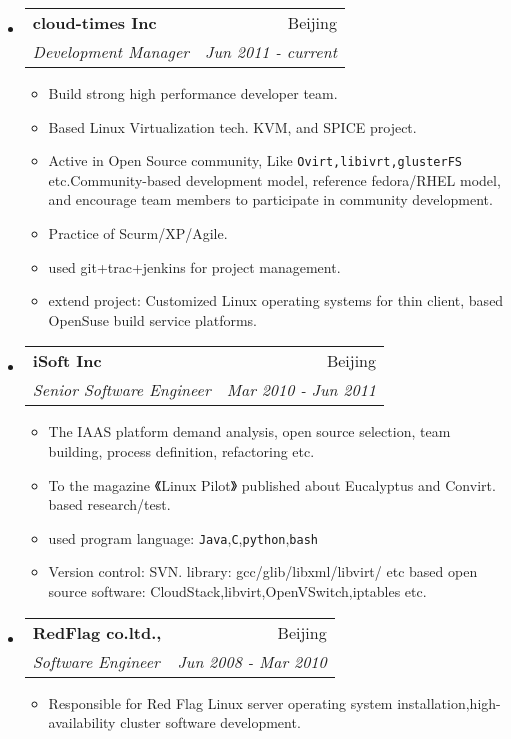 \documentclass[letterpaper,11pt]{article}
\makeatletter
\newcommand{\resitem}[1]{\item #1 \vspace{-2pt}}
\newcommand{\ressubheading}[4]{

\begin{tabular*}{6.5in}{l@{\cftdotfill{\cftsecdotsep}\extracolsep{\fill}}r}

		\textbf{#1} & #2 \\

		\textit{#3} & \textit{#4} \\

\end{tabular*}\vspace{-6pt}}
\makeatother
\begin{document}
\begin{itemize}

\item

	\ressubheading{cloud-times Inc}{Beijing}{Development Manager}{Jun 2011 - current}

	\begin{itemize}

		\resitem{Build strong high performance developer team.}
                \resitem{Based Linux Virtualization tech. KVM, and SPICE project.}
        \resitem{Active in Open Source community, Like \texttt{Ovirt,libivrt,glusterFS} etc.Community-based development model, reference fedora/RHEL model, and encourage team members to participate in community development.}
                \resitem{Practice of Scurm/XP/Agile.}
                \resitem{used git+trac+jenkins for project management.}
                \resitem{extend project: Customized Linux operating systems for thin client, based OpenSuse build service platforms.}

	\end{itemize}

\item

	\ressubheading{iSoft Inc}{Beijing}{Senior Software Engineer}{Mar 2010 - Jun 2011}

	\begin{itemize}

		\resitem{The IAAS platform demand analysis, open source selection, team building, process definition, refactoring etc.}

                \resitem{To the magazine 《Linux Pilot》 published about Eucalyptus and Convirt. based research/test.}

                \resitem{used program language: \texttt{Java},\texttt{C},\texttt{python},\texttt{bash}}
               
               \resitem{Version control: SVN. library: gcc/glib/libxml/libvirt/ etc based open source software: CloudStack,libvirt,OpenVSwitch,iptables etc.}

	\end{itemize}

\item

	\ressubheading{RedFlag co.ltd., }{Beijing}{Software Engineer}{Jun 2008 - Mar 2010}

	\begin{itemize}

		\resitem{Responsible for Red Flag Linux server operating system installation,high-availability cluster software development.}


\end{itemize}
\end{itemize}
\end{document}

